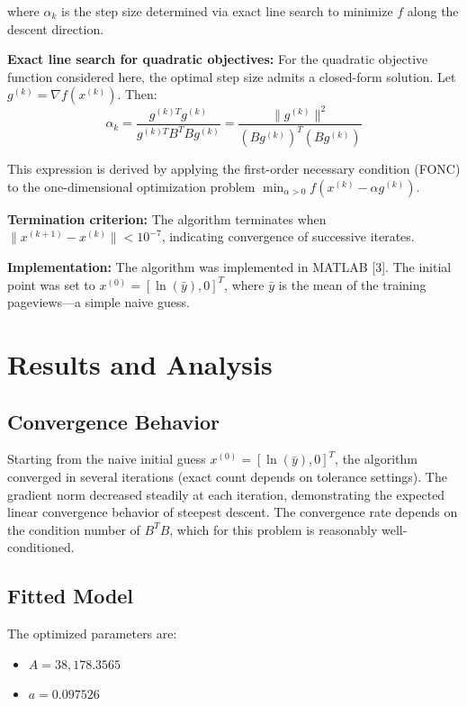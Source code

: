 \documentclass[11pt]{article}
\begin{document}
where $\alpha_k$ is the step size determined via exact line search to minimize $f$ along the descent direction.

\textbf{Exact line search for quadratic objectives:} For the quadratic objective function considered here, the optimal step size admits a closed-form solution. Let $g^{(k)} = \nabla f(x^{(k)})$. Then:
\begin{equation}
\alpha_k = \frac{g^{(k)T}g^{(k)}}{g^{(k)T}B^TB g^{(k)}} = \frac{\|g^{(k)}\|^2}{(Bg^{(k)})^T(Bg^{(k)})}
\end{equation}

This expression is derived by applying the first-order necessary condition (FONC) to the one-dimensional optimization problem $\min_{\alpha>0} f(x^{(k)} - \alpha g^{(k)})$.

\textbf{Termination criterion:} The algorithm terminates when $\|x^{(k+1)}-x^{(k)}\|<10^{-7}$, indicating convergence of successive iterates.

\textbf{Implementation:} The algorithm was implemented in MATLAB [3]. The initial point was set to $x^{(0)} = [\ln(\bar{y}), 0]^T$, where $\bar{y}$ is the mean of the training pageviews---a simple naive guess.

\section{Results and Analysis}

\subsection{Convergence Behavior}

Starting from the naive initial guess $x^{(0)} = [\ln(\bar{y}), 0]^T$, the algorithm converged in several iterations (exact count depends on tolerance settings). The gradient norm decreased steadily at each iteration, demonstrating the expected linear convergence behavior of steepest descent. The convergence rate depends on the condition number of $B^TB$, which for this problem is reasonably well-conditioned.

\subsection{Fitted Model}

The optimized parameters are:
\begin{itemize}
    \item $A = 38{,}178.3565$
    \item $a = 0.097526$
\end{itemize}
\end{document}

